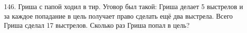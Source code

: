 146. Гриша с папой ходил в тир. Уговор был такой: Гриша делает 5 выстрелов и за каждое попадание в цель получает право сделать ещё два выстрела. Всего Гриша сделал 17 выстрелов. Сколько раз Гриша попал в цель?\\
